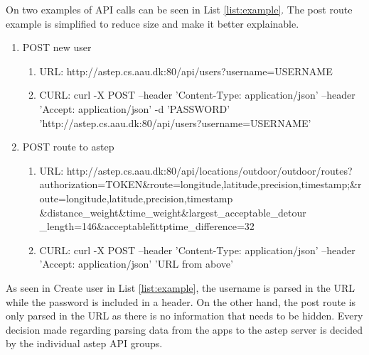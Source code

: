 On two examples of API calls can be seen in List \ref{list:example}.
The post route example is simplified to reduce size and make it better explainable.


\begin{enumerate}
\label{list:example}
\item POST new user
\begin{enumerate}
\item URL: http://astep.cs.aau.dk:80/api/users?username=USERNAME
\item CURL: curl -X POST --header 'Content-Type: application/json' --header 'Accept: application/json' -d 'PASSWORD' 'http://astep.cs.aau.dk:80/api/users?username=USERNAME'
\end{enumerate}
\item POST route to \gls{astep}
\begin{enumerate}
\item URL: http://astep.cs.aau.dk:80/api/locations/outdoor/outdoor/routes?authorization=TOKEN\&route=longitude,latitude,precision,timestamp;\&route=longitude,latitude,precision,timestamp
\&distance\_weight\&time\_weight\&largest\_acceptable\_detour\\
\_length=146\&acceptable\'httptime\_difference=32
\item CURL: curl -X POST --header 'Content-Type: application/json' --header 'Accept: application/json' 'URL from above'
\end{enumerate}
\end{enumerate}

As seen in Create user in List \ref{list:example}, the username is parsed in the URL while the password is included in a header.
On the other hand, the post route is only parsed in the URL as there is no information that needs to be hidden.
Every decision made regarding parsing data from the apps to the \gls{astep} server is decided by the individual \gls{astep} API groups.
